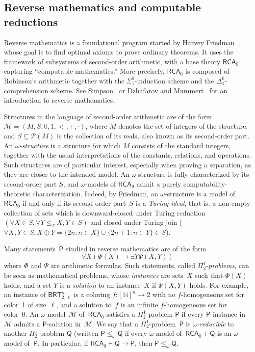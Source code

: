 \documentclass{article}
\newcommand{\Psf}{\mathsf{P}}
\newcommand{\Qsf}{\mathsf{Q}}
\def\P{\mathcal{P}}
\def\M{\mathcal{M}}
\newcommand{\RCA}[0]{\mathsf{RCA}}
\newcommand{\BRT}[0]{\mathsf{BRT}}
\newcommand{\NN}[0]{\mathbb{N}}
\def\qt#1{``#1''}%
\numberwithin{theorem}{section}
\begin{document}
\subsection{Reverse mathematics and computable reductions}

Reverse mathematics is a foundational program started by Harvey Friedman~\cite{friedman1975systems}, whose goal is to find optimal axioms to prove ordinary theorems. It uses the framework of subsystems of second-order arithmetic, with a base theory $\RCA_0$ capturing \qt{computable mathematics.} More precisely, $\RCA_0$ is composed of Robinson's arithmetic together with the $\Sigma^0_1$-induction scheme and the $\Delta^0_1$-comprehension scheme. See Simpson~\cite{simpson_subsystems_2009} or Dzhafarov and Mummert~\cite{dzhafarov_reverse_2022} for an introduction to reverse mathematics.

Structures in the language of second-order arithmetic are of the form $\M = (M, S, 0, 1, <, +, \cdot)$, where $M$ denotes the set of integers of the structure, and $S \subseteq \P(M)$ is the collection of its reals, also known as its second-order part. An \emph{$\omega$-structure} is a structure for which $M$ consists of the standard integers, together with the usual interpretations of the constants, relations, and operations. Such structures are of particular interest, especially when proving a separation, as they are closer to the intended model. An $\omega$-structure is fully characterized by its second-order part $S$, and $\omega$-models of $\RCA_0$ admit a purely computability-theoretic characterization. Indeed, by Friedman, an $\omega$-structure is a model of~$\RCA_0$ if and only if its second-order part~$S$ is a \emph{Turing ideal}, that is, a non-empty collection of sets which is downward-closed under Turing reduction $(\forall X \in S, \forall Y \leq_T X, Y \in S)$ and closed under Turing join ($\forall X, Y \in S, X \oplus Y = \{ 2n : n \in X \} \cup \{ 2n+1 : n \in Y \} \in S$).

Many statements~$\Psf$ studied in reverse mathematics are of the form 
$$\forall X(\Phi(X) \to \exists Y \Psi(X, Y))$$
where $\Phi$ and $\Psi$ are arithmetic formulas. Such statements, called \emph{$\Pi^1_2$-problems}, can be seen as mathematical problems, whose \emph{instances} are sets~$X$ such that $\Phi(X)$ holds, and a set $Y$ is a \emph{solution} to an instance~$X$ if $\Psi(X, Y)$ holds. For example, an instance of $\BRT^n_{2,\ell}$ is a coloring $f : [\NN]^n \to 2$ with no $f$-homogeneous set for color~1 of size~$\ell$, and a solution to~$f$ is an infinite $f$-homogeneous set for color~0. An $\omega$-model~$\M$ of~$\RCA_0$ satisfies a $\Pi^1_2$-problem $\Psf$ if every $\Psf$-instance in $\M$ admits a $\Psf$-solution in~$\M$. We say that a $\Pi^1_2$-problem~$\Psf$ is \emph{$\omega$-reducible} to another $\Pi^1_2$-problem $\Qsf$ (written $\Psf \leq_\omega \Qsf$ if every $\omega$-model of~$\RCA_0 + \Qsf$ is an $\omega$-model of~$\Psf$. In particular, if $\RCA_0 \vdash \Qsf \to \Psf$, then $\Psf \leq_\omega \Qsf$.
\end{document}
